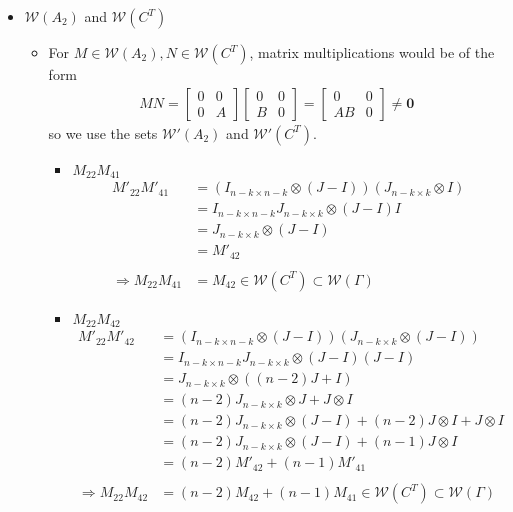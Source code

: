 \documentclass{article}
\begin{document}
\begin{itemize}
    \item $\mathcal{W}(A_2)$ and $\mathcal{W}(C^T)$ \\
    \begin{itemize}
        \item For $M\in\mathcal{W}(A_2),N \in \mathcal{W}(C^T)$, matrix multiplications would be of the form \\
        \begin{align*}
            MN = \begin{bmatrix}
                0 & 0 \\ 0 & A
            \end{bmatrix}\begin{bmatrix}
                0&0\\B&0
            \end{bmatrix} = \begin{bmatrix}
                0&0\\AB&0
            \end{bmatrix} \neq \mathbf{0}
        \end{align*}
        so we use the sets $\mathcal{W'}(A_2)$ and $\mathcal{W'}(C^T)$. \\
        \begin{itemize}
            \item $M_{22}M_{41}$
            \begin{align*}
                M'_{22}M'_{41}
                &= (I_{n-k\times n-k} \otimes (J-I))(J_{n-k\times k}\otimes I) \\
                &= I_{n-k\times n-k}J_{n-k\times k} \otimes (J-I)I \\
                &= J_{n-k\times k} \otimes (J-I) \\
                &= M'_{42} \\\\
                \Rightarrow M_{22}M_{41} &= M_{42} \in \mathcal{W}(C^T) \subset\mathcal{W}(\Gamma)
            \end{align*}
            
            \item $M_{22}M_{42}$
            \begin{align*}
                M'_{22}M'_{42}
                &= (I_{n-k\times n-k} \otimes (J-I))(J_{n-k\times k}\otimes (J-I)) \\
                &= I_{n-k\times n-k}J_{n-k\times k} \otimes (J-I)(J-I) \\
                &= J_{n-k\times k} \otimes ((n-2)J+I) \\
                &= (n-2)J_{n-k\times k}\otimes J + J\otimes I \\
                &= (n-2)J_{n-k\times k}\otimes(J-I) + (n-2)J\otimes I + J\otimes I \\
                &= (n-2)J_{n-k\times k}\otimes (J-I) + (n-1)J\otimes I \\
                &= (n-2)M'_{42} + (n-1)M'_{41} \\\\
                \Rightarrow M_{22}M_{42} &= (n-2)M_{42} + (n-1)M_{41} \in \mathcal{W}(C^T)\subset\mathcal{W}(\Gamma)
            \end{align*}
            

\end{itemize}
\end{itemize}
\end{itemize}
\end{document}
